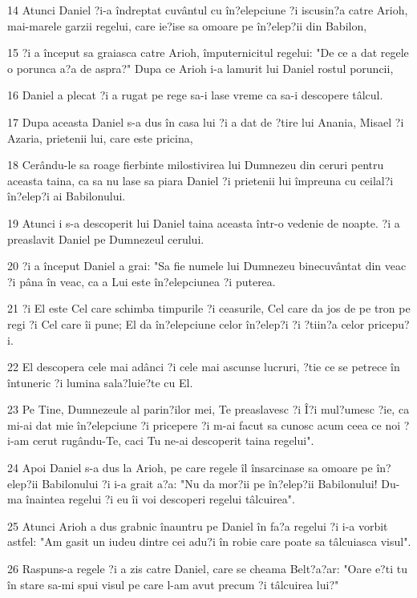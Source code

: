 \par 14 Atunci Daniel ?i-a îndreptat cuvântul cu în?elepciune ?i iscusin?a catre Arioh, mai-marele garzii regelui, care ie?ise sa omoare pe în?elep?ii din Babilon,
\par 15 ?i a început sa graiasca catre Arioh, împuternicitul regelui: "De ce a dat regele o porunca a?a de aspra?" Dupa ce Arioh i-a lamurit lui Daniel rostul poruncii,
\par 16 Daniel a plecat ?i a rugat pe rege sa-i lase vreme ca sa-i descopere tâlcul.
\par 17 Dupa aceasta Daniel s-a dus în casa lui ?i a dat de ?tire lui Anania, Misael ?i Azaria, prietenii lui, care este pricina,
\par 18 Cerându-le sa roage fierbinte milostivirea lui Dumnezeu din ceruri pentru aceasta taina, ca sa nu lase sa piara Daniel ?i prietenii lui împreuna cu ceilal?i în?elep?i ai Babilonului.
\par 19 Atunci i s-a descoperit lui Daniel taina aceasta într-o vedenie de noapte. ?i a preaslavit Daniel pe Dumnezeul cerului.
\par 20 ?i a început Daniel a grai: "Sa fie numele lui Dumnezeu binecuvântat din veac ?i pâna în veac, ca a Lui este în?elepciunea ?i puterea.
\par 21 ?i El este Cel care schimba timpurile ?i ceasurile, Cel care da jos de pe tron pe regi ?i Cel care îi pune; El da în?elepciune celor în?elep?i ?i ?tiin?a celor pricepu?i.
\par 22 El descopera cele mai adânci ?i cele mai ascunse lucruri, ?tie ce se petrece în întuneric ?i lumina sala?luie?te cu El.
\par 23 Pe Tine, Dumnezeule al parin?ilor mei, Te preaslavesc ?i Î?i mul?umesc ?ie, ca mi-ai dat mie în?elepciune ?i pricepere ?i m-ai facut sa cunosc acum ceea ce noi ?i-am cerut rugându-Te, caci Tu ne-ai descoperit taina regelui".
\par 24 Apoi Daniel s-a dus la Arioh, pe care regele îl însarcinase sa omoare pe în?elep?ii Babilonului ?i i-a grait a?a: "Nu da mor?ii pe în?elep?ii Babilonului! Du-ma înaintea regelui ?i eu îi voi descoperi regelui tâlcuirea".
\par 25 Atunci Arioh a dus grabnic înauntru pe Daniel în fa?a regelui ?i i-a vorbit astfel: "Am gasit un iudeu dintre cei adu?i în robie care poate sa tâlcuiasca visul".
\par 26 Raspuns-a regele ?i a zis catre Daniel, care se cheama Belt?a?ar: "Oare e?ti tu în stare sa-mi spui visul pe care l-am avut precum ?i tâlcuirea lui?"
